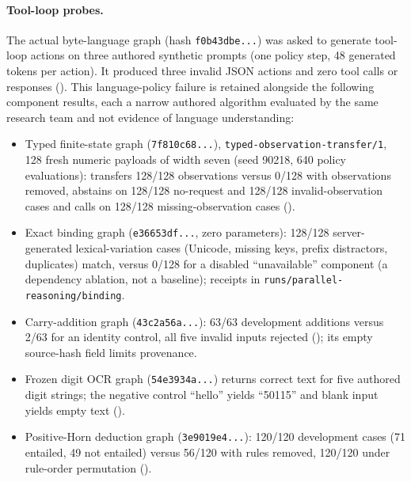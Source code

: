 \documentclass[11pt]{article}
\begin{document}
\paragraph{Tool-loop probes.} The actual byte-language graph (hash \texttt{f0b43dbe...}) was asked to
generate tool-loop actions on three authored synthetic prompts (one policy step, 48 generated
tokens per action). It produced three invalid JSON actions and zero tool calls or responses
(). This language-policy failure is
retained alongside the following component results, each a narrow authored algorithm evaluated
by the same research team and not evidence of language understanding:
\begin{itemize}\setlength\itemsep{0pt}
\item Typed finite-state graph (\texttt{7f810c68...}), \texttt{typed-observation-transfer/1}, 128 fresh
numeric payloads of width seven (seed 90218, 640 policy evaluations): transfers 128/128
observations versus 0/128 with observations removed, abstains on 128/128 no-request and 128/128
invalid-observation cases and calls on 128/128 missing-observation cases
().
\item Exact binding graph (\texttt{e36653df...}, zero parameters): 128/128 server-generated lexical-variation cases
(Unicode, missing keys, prefix distractors, duplicates) match, versus 0/128 for a disabled
``unavailable'' component (a dependency ablation, not a baseline); receipts in
\texttt{runs/parallel-reasoning/binding}.
\item Carry-addition graph (\texttt{43c2a56a...}): 63/63 development additions versus 2/63 for an identity
control, all five invalid inputs rejected (); its
empty source-hash field limits provenance.
\item Frozen digit OCR graph (\texttt{54e3934a...}) returns correct text for five authored digit strings;
the negative control ``hello'' yields ``50115'' and blank input yields empty text
().
\item Positive-Horn deduction graph (\texttt{3e9019e4...}): 120/120 development cases (71 entailed, 49 not
entailed) versus 56/120 with rules removed, 120/120 under rule-order permutation
().
\end{itemize}
\end{document}
